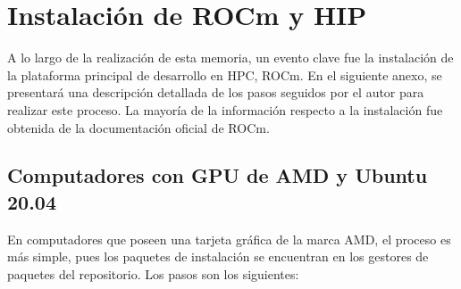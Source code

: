 
\section{Instalación de ROCm y HIP}

A lo largo de la realización de esta memoria, un evento clave fue la instalación de la plataforma principal de desarrollo en HPC, ROCm. 
En el siguiente anexo, se presentará una descripción detallada de los pasos seguidos por el autor para realizar este proceso. 
La mayoría de la información respecto a la instalación fue obtenida de la documentación oficial de ROCm.

\subsection*{Computadores con GPU de AMD y Ubuntu 20.04}

En computadores que poseen una tarjeta gráfica de la marca AMD, el proceso es más simple, pues los paquetes de instalación se encuentran en los gestores de paquetes del repositorio. Los pasos son los siguientes:

